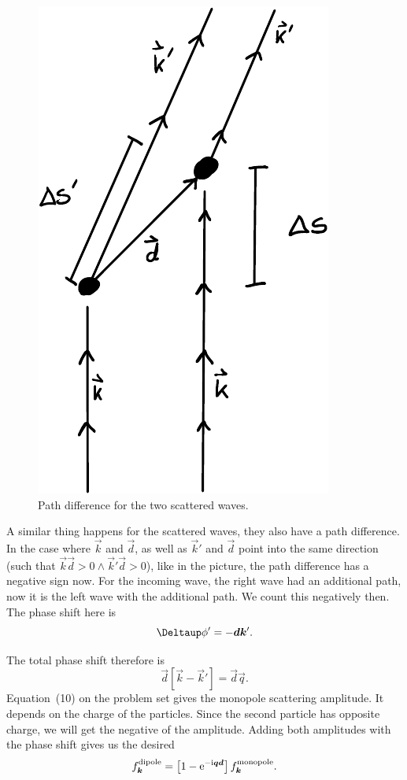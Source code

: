 \documentclass[11pt, english, fleqn, DIV=15, headinclude, BCOR=1.5cm]{scrartcl}
\begin{document}
\begin{figure}[htbp]
    \centering
    \includegraphics{Drawing-0001.pdf}
    \caption{%
        Path difference for the two scattered waves.
    }
    \label{fig:sketch}
\end{figure}

A similar thing happens for the scattered waves, they also have a path
difference. In the case where $\vec k$ and $\vec d$, as well as $\vec k'$ and
$\vec d$ point into the same direction (such that $\vec k \vec d > 0 \land \vec
k' \vec d > 0$), like in the picture, the path difference has a negative sign
now. For the incoming wave, the right wave had an additional path, now it is
the left wave with the additional path. We count this negatively then. The
phase shift here is
\[
    \Deltaup \phi' = - \vec d \vec k'.
\]

The total phase shift therefore is
\[
    \vec d [\vec k - \vec k']
    =
    \vec d \vec q.
\]
Equation~(10) on the problem set gives the monopole scattering amplitude. It
depends on the charge of the particles. Since the second particle has opposite
charge, we will get the negative of the amplitude. Adding both amplitudes with
the phase shift gives us the desired
\[
    f_{\boldsymbol{k}}^\text{dipole}
    = \left[ 1 - \mathrm e^{- \mathrm i \boldsymbol{q} \boldsymbol{d}} \right] f_{\boldsymbol{k}}^\text{monopole}.
\]
\end{document}
